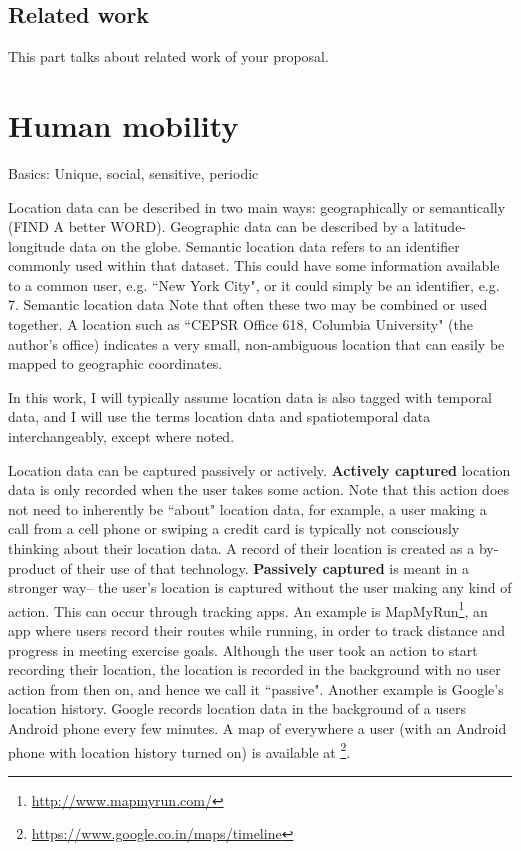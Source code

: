 \documentclass[12pt]{article}
\begin{document}
\subsection{Related work}
\label{ch:related}

This part talks about related work of your proposal.

\section{Human mobility}
\label{sec:mobility}

Basics: Unique, social, sensitive, periodic

Location data can be described in two main ways: geographically or semantically (FIND A better WORD).
Geographic data can be described by a latitude-longitude data on the globe.
Semantic location data refers to an identifier commonly used within that dataset.
This could have some information available to a common user, e.g. ``New York City", or it could simply be an identifier, e.g. 7.
Semantic location data 
Note that often these two may be combined or used together.
A location such as ``CEPSR Office 618, Columbia University" (the author's office) indicates a very small, non-ambiguous location that can easily be mapped to geographic coordinates.

In this work, I will typically assume location data is also tagged with temporal data, and I will use the terms location data and spatiotemporal data interchangeably, except where noted.


Location data can be captured passively or actively.
\textbf{Actively captured} location data is only recorded when the user takes some action.
Note that this action does not need to inherently be ``about" location data, for example, a user making a call from a cell phone or swiping a credit card is typically not consciously thinking about their location data. 
A record of their location is created as a by-product of their use of that technology.
\textbf{Passively captured} is meant in a stronger way-- the user's location is captured without the user making any kind of action.
This can occur through tracking apps.
An example is MapMyRun\footnote{\url{http://www.mapmyrun.com/}}, an app where users record their routes while running, in order to track distance and progress in meeting exercise goals.
Although the user took an action to start recording their location, the location is recorded in the background with no user action from then on, and hence we call it ``passive".
Another example is Google's location history.
Google records location data in the background of a users Android phone every few minutes.
A map of everywhere a user (with an Android phone with location history turned on) is available at \footnote{\url{https://www.google.co.in/maps/timeline}}.
\end{document}
